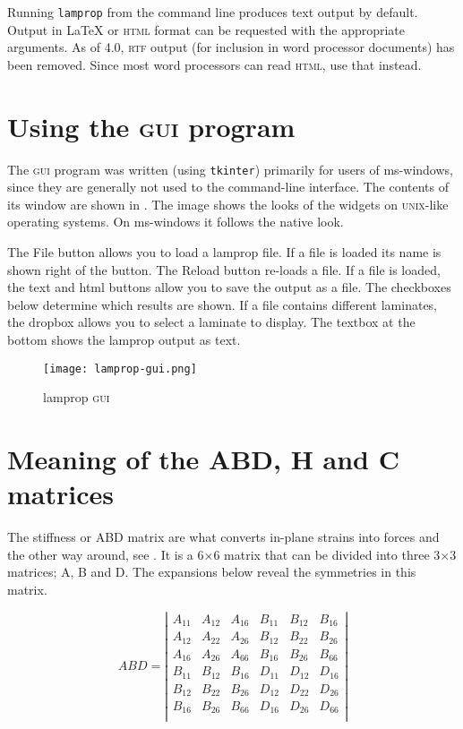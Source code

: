 \documentclass[a4paper,landscape,oneside,11pt,twocolumn]{memoir}
\begin{document}
Running \texttt{lamprop} from the command line produces text output by
default. Output in \LaTeX{} or \textsc{html} format can be requested with the
appropriate arguments. As of 4.0, \textsc{rtf} output (for inclusion in word
processor documents) has been removed. Since most word processors can read
\textsc{html}, use that instead.


\section{Using the \textsc{gui} program} %

The \textsc{gui} program was written (using \texttt{tkinter}) primarily for
users of ms-windows, since they are generally not used to the command-line
interface. The contents of its window are shown in . The
image shows the looks of the widgets on \textsc{unix}-like operating systems.
On ms-windows it follows the native look.

The \textsf{File} button allows you to load a lamprop file. If a file is
loaded its name is shown right of the button. The \textsf{Reload} button
re-loads a file.
If a file is loaded, the \textsf{text} and \textsf{html} buttons allow you
to save the output as a file.
The checkboxes below determine which results are shown. If
a file contains different laminates, the dropbox allows you to select
a laminate to display. The textbox at the bottom shows the lamprop output as
text.

\begin{figure}[!htbp]
  \centerline{\texttt{[image: lamprop-gui.png]}}
  \caption{\label{fig:lamprop-gui}lamprop \textsc{gui}}
\end{figure}



\section{Meaning of the ABD, H and C matrices} %

The stiffness or ABD matrix are what converts
in-plane strains into forces and the other way around, see
.  It is a 6×6 matrix that can be divided
into three 3×3 matrices; A, B and D.
The expansions below reveal the symmetries in this matrix.

\[
    ABD = \left|\begin{array}{cccccc}
        A_{11} & A_{12} & A_{16} & B_{11} & B_{12} & B_{16}\\
        A_{12} & A_{22} & A_{26} & B_{12} & B_{22} & B_{26}\\
        A_{16} & A_{26} & A_{66} & B_{16} & B_{26} & B_{66}\\
        B_{11} & B_{12} & B_{16} & D_{11} & D_{12} & D_{16}\\
        B_{12} & B_{22} & B_{26} & D_{12} & D_{22} & D_{26}\\
        B_{16} & B_{26} & B_{66} & D_{16} & D_{26} & D_{66}\\
    \end{array}\right|
\]
\end{document}
